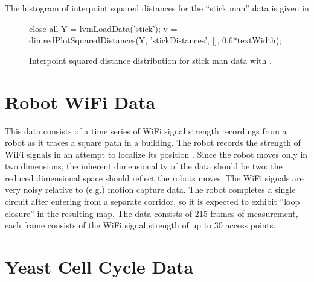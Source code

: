 The histogram of interpoint squared distances for the ``stick man'' data is given in %
\begin{figure}
  \begin{matlab}
    close all
    Y = lvmLoadData('stick');
    v = dimredPlotSquaredDistances(Y, 'stickDistances', [], 0.6*textWidth);
  \end{matlab}

  \begin{center}
  \end{center}
  
  
  \caption{Interpoint squared distance distribution for stick man data
    with \captionInfo.}\label{fig:stickManDistances}

\end{figure}

\section{Robot WiFi Data}

This data consists of a time series of WiFi signal strength recordings
from a robot as it traces a square path in a building. The robot
records the strength of WiFi signals in an attempt to localize its
position \citep[see][for an application]{Ferris:wifi07}. Since the
robot moves only in two dimensions, the inherent dimensionality of the
data should be two: the reduced dimensional space should reflect the
robots moves. The WiFi signals are very noisy relative to (e.g.)
motion capture data. The robot completes a single circuit after
entering from a separate corridor, so it is expected to exhibit ``loop
closure'' in the resulting map. The data consists of 215 frames of
measurement, each frame consists of the WiFi signal strength of up to
30 access points.


\section{Yeast Cell Cycle Data}


